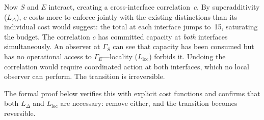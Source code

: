 \documentclass[11pt]{article}
\begin{document}
Now $S$ and $E$ interact, creating a cross-interface correlation~$c$.  By superadditivity ($L_\Delta$), $c$ costs more to enforce jointly with the existing distinctions than its individual cost would suggest: the total at each interface jumps to~15, saturating the budget.  The correlation $c$ has committed capacity at \emph{both} interfaces simultaneously.  An observer at $\Gamma_S$ can see that capacity has been consumed but has no operational access to $\Gamma_E$---locality ($L_{\mathrm{loc}}$) forbids it.  Undoing the correlation would require coordinated action at both interfaces, which no local observer can perform.  The transition is irreversible.

The formal proof below verifies this with explicit cost functions and confirms that both $L_\Delta$ and $L_{\mathrm{loc}}$ are necessary: remove either, and the transition becomes reversible.
\end{document}
